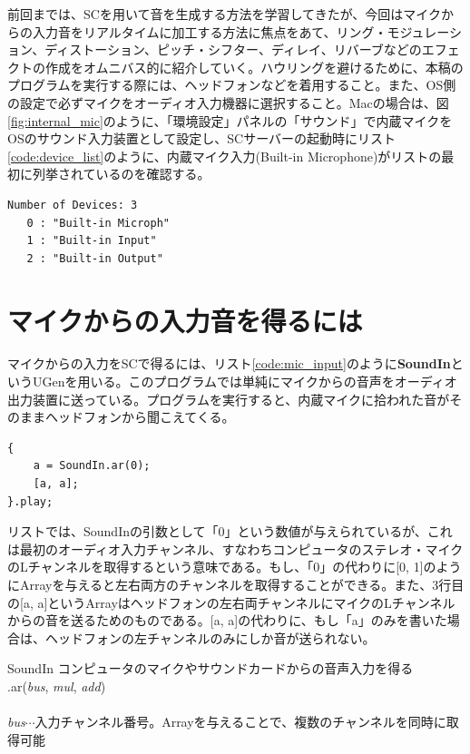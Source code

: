 \documentclass{jsarticle}
\begin{document}
\begin{figure}

\end{figure}
前回までは、SCを用いて音を生成する方法を学習してきたが、今回はマイクからの入力音をリアルタイムに加工する方法に焦点をあて、リング・モジュレーション、ディストーション、ピッチ・シフター、ディレイ、リバーブなどのエフェクトの作成をオムニバス的に紹介していく。ハウリングを避けるために、本稿のプログラムを実行する際には、ヘッドフォンなどを着用すること。また、OS側の設定で必ずマイクをオーディオ入力機器に選択すること。Macの場合は、図\ref{fig:internal_mic}のように、「環境設定」パネルの「サウンド」で内蔵マイクをOSのサウンド入力装置として設定し、SCサーバーの起動時にリスト\ref{code:device_list}のように、内蔵マイク入力(Built-in Microphone)がリストの最初に列挙されているのを確認する。

\begin{lstlisting}[caption=入出力デバイスのリスト,label=code:device_list]
Number of Devices: 3
   0 : "Built-in Microph"
   1 : "Built-in Input"
   2 : "Built-in Output"
\end{lstlisting}

\section{マイクからの入力音を得るには}
マイクからの入力をSCで得るには、リスト\ref{code:mic_input}のように{\bf SoundIn}というUGenを用いる。このプログラムでは単純にマイクからの音声をオーディオ出力装置に送っている。プログラムを実行すると、内蔵マイクに拾われた音がそのままヘッドフォンから聞こえてくる。

\begin{lstlisting}[caption=マイク入力,label=code:mic_input]
{
	a = SoundIn.ar(0);
	[a, a];
}.play;
\end{lstlisting}

リストでは、SoundInの引数として「0」という数値が与えられているが、これは最初のオーディオ入力チャンネル、すなわちコンピュータのステレオ・マイクのLチャンネルを取得するという意味である。もし、「0」の代わりに[0, 1]のようにArrayを与えると左右両方のチャンネルを取得することができる。また、3行目の[a, a]というArrayはヘッドフォンの左右両チャンネルにマイクのLチャンネルからの音を送るためのものである。[a, a]の代わりに、もし「a」のみを書いた場合は、ヘッドフォンの左チャンネルのみにしか音が送られない。
\begin{itembox}[l]{SoundIn}
{\footnotesize 
コンピュータのマイクやサウンドカードからの音声入力を得る\\
.ar({\it bus}, {\it mul}, {\it add})\\\\
{\it bus}$\cdots$入力チャンネル番号。Arrayを与えることで、複数のチャンネルを同時に取得可能\\
}
\end{itembox}
\end{document}
